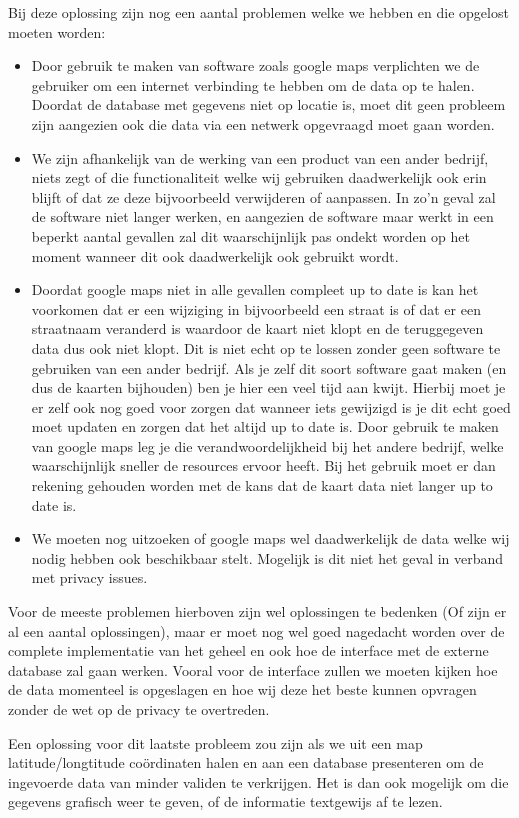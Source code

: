 Bij deze oplossing zijn nog een aantal problemen welke we hebben en die opgelost moeten worden:
\begin{itemize}
        \item Door gebruik te maken van software zoals google maps verplichten we de gebruiker om een internet verbinding te hebben om de data op te halen. Doordat de database met gegevens niet op locatie is, moet dit geen probleem zijn aangezien ook die data via een netwerk opgevraagd moet gaan worden.
        \item We zijn afhankelijk van de werking van een product van een ander bedrijf, niets zegt of die functionaliteit welke wij  gebruiken daadwerkelijk ook erin blijft of dat ze deze bijvoorbeeld verwijderen of aanpassen. In zo'n geval zal de software niet langer werken, en aangezien de software maar werkt in een beperkt aantal gevallen zal dit waarschijnlijk pas ondekt worden op het moment wanneer dit ook daadwerkelijk ook gebruikt wordt. 
        \item Doordat google maps niet in alle gevallen compleet up to date is kan het voorkomen dat er een wijziging in bijvoorbeeld een straat is of dat er een straatnaam veranderd is waardoor de kaart niet klopt en de teruggegeven data dus ook niet klopt. Dit is niet echt op te lossen zonder geen software te gebruiken van een ander bedrijf. Als je zelf dit soort software gaat maken (en dus de kaarten bijhouden) ben je hier een veel tijd aan kwijt. Hierbij moet je er zelf ook nog goed voor zorgen dat wanneer iets gewijzigd is je dit echt goed moet updaten en zorgen dat het altijd up to date is. Door gebruik te maken van google maps leg je die verandwoordelijkheid bij het andere bedrijf, welke waarschijnlijk sneller de resources ervoor heeft. Bij het gebruik moet er dan rekening gehouden worden met de kans dat de kaart data niet langer up to date is. 
        \item We moeten nog uitzoeken of google maps wel daadwerkelijk de data welke wij nodig hebben ook beschikbaar stelt. Mogelijk is dit niet het geval in verband met privacy issues.
\end{itemize}
Voor de meeste problemen hierboven zijn wel oplossingen te bedenken (Of zijn er al een aantal oplossingen), maar er moet nog wel goed nagedacht worden over de complete implementatie van het geheel en ook hoe de interface met de externe database zal gaan werken. Vooral voor de interface zullen we moeten kijken hoe de data momenteel is opgeslagen en hoe wij deze het beste kunnen opvragen zonder de wet op de privacy te overtreden.

Een oplossing voor dit laatste probleem zou zijn als we uit een map latitude/longtitude co\"{o}rdinaten halen en aan een database presenteren om de ingevoerde data van minder validen te verkrijgen. Het is dan ook mogelijk om die gegevens grafisch weer te geven, of de informatie textgewijs af te lezen.
